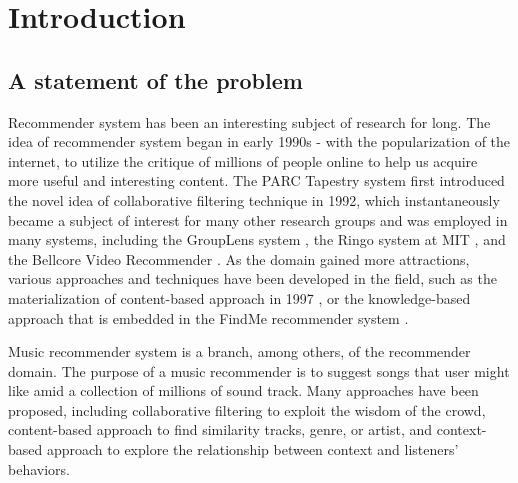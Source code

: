 
\chapter{Introduction} %

\label{Chapter1} %


\newcommand{\keyword}[1]{\textbf{#1}}
\newcommand{\tabhead}[1]{\textbf{#1}}
\newcommand{\code}[1]{\texttt{#1}}
\newcommand{\file}[1]{\texttt{\bfseries#1}}
\newcommand{\option}[1]{\texttt{\itshape#1}}


\section{A statement of the problem}
Recommender system has been an interesting subject of research for long. The idea of recommender system began in early 1990s - with the popularization of the internet, to utilize the critique of millions of people online to help us acquire more useful and interesting content. The PARC Tapestry system \cite{goldberg1992using} first introduced the novel idea of collaborative filtering technique in 1992, which instantaneously became a subject of interest for many other research groups and was employed in many systems, including the GroupLens system \cite{resnick1994open}, the Ringo system at MIT \cite{shardanand1995social}, and the Bellcore Video Recommender \cite{hill1995recommending}. As the domain gained more attractions, various approaches and techniques have been developed in the field, such as the materialization of content-based approach in 1997 \cite{balabanovic1997content}, or the knowledge-based approach that is embedded in the FindMe recommender system \cite{trewin2000knowledge}. 

Music recommender system is a branch, among others, of the recommender domain. The purpose of a music recommender is to suggest songs that user might like amid a collection of millions of sound track. Many approaches have been proposed, including collaborative filtering to exploit the wisdom of the crowd, content-based approach to find similarity tracks, genre, or artist, and context-based approach to explore the relationship between context and listeners' behaviors. 

